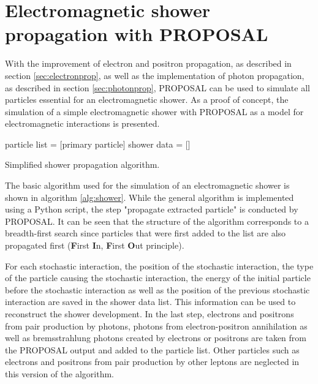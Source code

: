 \section{Electromagnetic shower propagation with PROPOSAL}

With the improvement of electron and positron propagation, as described in section \ref{sec:electronprop}, as well as the implementation of photon propagation, as described in section \ref{sec:photonprop}, PROPOSAL can be used to simulate all particles essential for an electromagnetic shower.
As a proof of concept, the simulation of a simple electromagnetic shower with PROPOSAL as a model for electromagnetic interactions is presented.

\begin{algorithm}[H]
\DontPrintSemicolon
 particle list = [primary particle]\;
 shower data = [\:]\;
 \caption{Simplified shower propagation algorithm.}
 \label{alg:shower}
\end{algorithm}

The basic algorithm used for the simulation of an electromagnetic shower is shown in algorithm \ref{alg:shower}.
While the general algorithm is implemented using a Python script, the step "propagate extracted particle" is conducted by PROPOSAL. 
It can be seen that the structure of the algorithm corresponds to a breadth-first search since particles that were first added to the list are also propagated first (\textbf{F}irst \textbf{I}n, \textbf{F}irst \textbf{O}ut principle).

For each stochastic interaction, the position of the stochastic interaction, the type of the particle causing the stochastic interaction, the energy of the initial particle before the stochastic interaction as well as the position of the previous stochastic interaction are saved in the shower data list.
This information can be used to reconstruct the shower development.
In the last step, electrons and positrons from pair production by photons, photons from electron-positron annihilation as well as bremsstrahlung photons created by electrons or positrons are taken from the PROPOSAL output and added to the particle list.
Other particles such as electrons and positrons from pair production by other leptons are neglected in this version of the algorithm.

